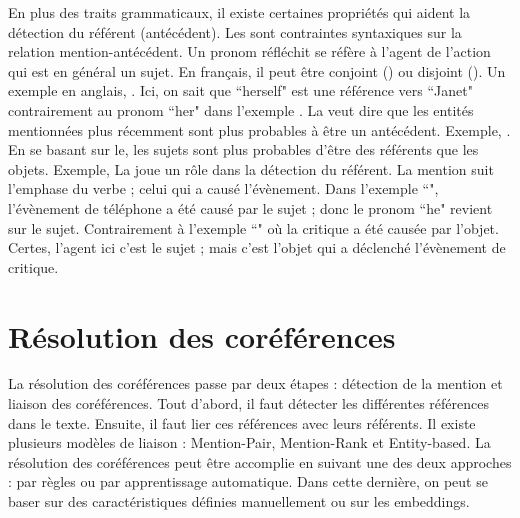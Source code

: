\documentclass{KodeBook}
\begin{document}
En plus des traits grammaticaux, il existe certaines propriétés qui aident la détection du référent (antécédent).
Les   sont contraintes syntaxiques sur la relation mention-antécédent.
Un pronom réfléchit se réfère à l'agent de l'action qui est en général un sujet. 
En français, il peut être conjoint () ou disjoint ().
Un exemple en anglais, . 
Ici, on sait que ``herself" est une référence vers ``Janet" contrairement au pronom ``her" dans l'exemple .
La  veut dire que les entités mentionnées plus récemment sont plus probables à être un antécédent.
Exemple, .
En se basant sur le, les sujets sont plus probables d'être des référents que les objets. 
Exemple, 
La  joue un rôle dans la détection du référent. 
La mention suit l'emphase du verbe ; celui qui a causé l'évènement.
Dans l'exemple ``", l'évènement de téléphone a été causé par le sujet ; donc le pronom ``he" revient sur le sujet. 
Contrairement à l'exemple ``" où la critique a été causée par l'objet. 
Certes, l'agent ici c'est le sujet ; mais c'est l'objet qui a déclenché l'évènement de critique.

\section{Résolution des coréférences}

La résolution des coréférences passe par deux étapes : détection de la mention et liaison des coréférences. 
Tout d'abord, il faut détecter les différentes références dans le texte. 
Ensuite, il faut lier ces références avec leurs référents.
Il existe plusieurs modèles de liaison : Mention-Pair, Mention-Rank et Entity-based.
La résolution des coréférences peut être accomplie en suivant une des deux approches : par règles ou par apprentissage automatique. 
Dans cette dernière, on peut se baser sur des caractéristiques définies manuellement ou sur les embeddings.
\end{document}
